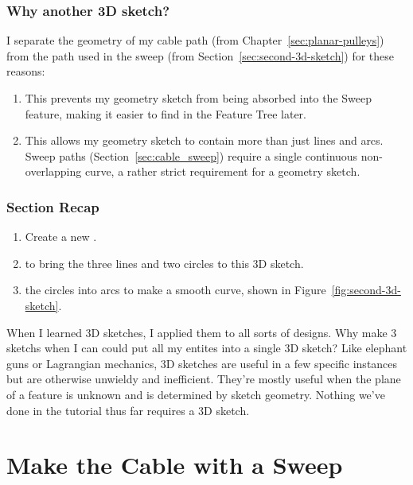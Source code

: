 \subsubsection{Why another 3D sketch?}

I separate the geometry of my cable path (from Chapter~\ref{sec:planar-pulleys})
from the path used in the sweep (from Section~\ref{sec:second-3d-sketch}) for
these reasons:

\begin{enumerate}
\item{} This prevents my geometry sketch from being absorbed into the Sweep feature,
making it easier to find in the Feature Tree later.
\item{} This allows my geometry sketch to contain more than just lines and arcs.
Sweep paths (Section~\ref{sec:cable_sweep}) require a single continuous
non-overlapping curve, a rather strict requirement for a geometry sketch.
\end{enumerate}

\subsubsection{Section Recap}

\begin{enumerate}
\item{} Create a new .
\item{}  to bring the three lines and two circles to this 3D
sketch.
\item{}  the circles into arcs to make a smooth curve, shown in Figure~\ref{fig:second-3d-sketch}.
\end{enumerate}

\begin{aside}
\label{aside:3d_sketch_warning}

When I learned 3D sketches, I applied them to all sorts of designs. Why make 3
sketchs when I can could put all my entites into a single 3D sketch? Like
elephant guns or Lagrangian mechanics, 3D sketches are useful in a few specific
instances but are otherwise unwieldy and
inefficient. They're mostly useful when the plane of a feature is unknown and is
determined by sketch geometry. Nothing we've done in the tutorial thus far
requires a 3D sketch.

\end{aside}

\section{Make the Cable with a Sweep}

